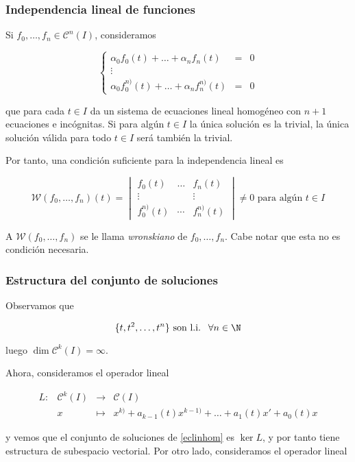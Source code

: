 \subsubsection{Independencia lineal de funciones}
Si $f_0, \dots, f_n\in \mathscr{C}^n(I)$, consideramos

\[
\left\{\begin{array}{lcl}
  \alpha_0 f_0(t) + \dots + \alpha_n f_n(t) & = & 0\\
  \vdots\\
  \alpha_0 f^{n)}_0(t) + \dots + \alpha_n f^{n)}_n(t) & = & 0
\end{array}\right.
\]

que para cada $t\in I$ da un sistema de ecuaciones lineal homogéneo con $n+1$ ecuaciones e incógnitas. Si para
algún $t\in I$ la única solución es la trivial, la única solución válida para todo $t\in I$ será también la trivial.

Por tanto, una condición suficiente para la independencia lineal es

\[
\mathcal{W}(f_0,\dots,f_n)(t) = \begin{vmatrix}
  f_0(t) & \dots & f_n(t)\\
  \vdots &  & \vdots\\
  f_0^{n)}(t) & \cdots & f_n^{n)}(t)
\end{vmatrix} \ne 0 \text{ para algún } t\in I
\]

A $\mathcal{W}(f_0,\dots,f_n)$ se le llama \emph{wronskiano} de $f_0,\dots,f_n$. Cabe notar que esta no es condición necesaria.

\subsubsection{Estructura del conjunto de soluciones}
Observamos que

\[ \{ t, t^2, \dots, t^n \} \text{ son l.i. } \ \forall n\in \N \]

luego $\dim \mathscr{C}^k(I) = \infty$.

Ahora, consideramos el operador lineal

\[
\begin{array}{llll}
  L: & \mathscr{C}^k(I) & \to & \mathscr{C}(I)\\
    & x & \mapsto & x^{k)} + a_{k-1}(t)x^{k-1)} + \dots + a_1(t)x' + a_0(t)x
\end{array}
\]

y vemos que el conjunto de soluciones de \eqref{eclinhom} es $\ker L$, y por tanto tiene
estructura de subespacio vectorial. Por otro lado, consideramos el operador lineal

